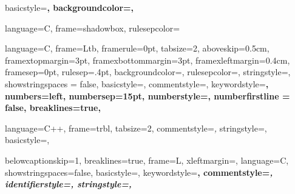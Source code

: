 {
  basicstyle=\scriptsize\bf\ttfamily,
  backgroundcolor=\color{gray75},
}

{
  language=C,
  frame=shadowbox, 
  rulesepcolor=\color{blue}
}

{
  language=C,
  frame=Ltb,
  framerule=0pt,
  tabsize=2,
  aboveskip=0.5cm,
  framextopmargin=3pt,
  framexbottommargin=3pt,
  framexleftmargin=0.4cm,
  framesep=0pt,
  rulesep=.4pt,
  backgroundcolor=\color{gray97},
  rulesepcolor=\color{black},
  stringstyle=\ttfamily,
  showstringspaces = false,
  basicstyle=\footnotesize\ttfamily,
  commentstyle=\color{gray45},
  keywordstyle=\bfseries,
  numbers=left,
  numbersep=15pt,
  numberstyle=\tiny,
  numberfirstline = false,
  breaklines=true,
}	

{
  language=C++,
  frame=trbl,
  tabsize=2,
  commentstyle=\textit,
  stringstyle=\ttfamily, 
  basicstyle=\small,
}	

{
  belowcaptionskip=1\baselineskip,
  breaklines=true,
  frame=L,
  xleftmargin=\parindent,
  language=C,
  showstringspaces=false,
  basicstyle=\footnotesize\ttfamily,
  keywordstyle=\bfseries\color{green!40!black},
  commentstyle=\itshape\color{purple!40!black},
  identifierstyle=\color{blue},
  stringstyle=\color{orange},
}



\usepackage{sidecap}

